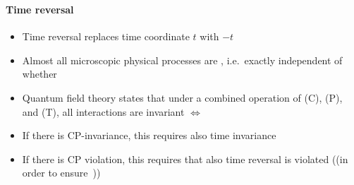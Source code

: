 \begin{frame}
\frametitle{\texorpdfstring{\culine[\sectiontitleulinecolor]{\sectiontitle}}{\sectiontitle} }
\framesubtitle{Time reversal}

\begin{itemize}
	\item Time reversal replaces time coordinate $t$ with $-t$

\item Almost all microscopic physical processes are , i.e.~exactly  independent of whether 

\item Quantum field theory states that under a combined operation of  (C),  (P), and  (T), all interactions are invariant $\Leftrightarrow$ 

\item If there is CP-invariance, this requires also time invariance 

\item If there is CP violation, this requires that also time reversal is violated ((in order to ensure \,))
\end{itemize}

\endofsection
\end{frame}



